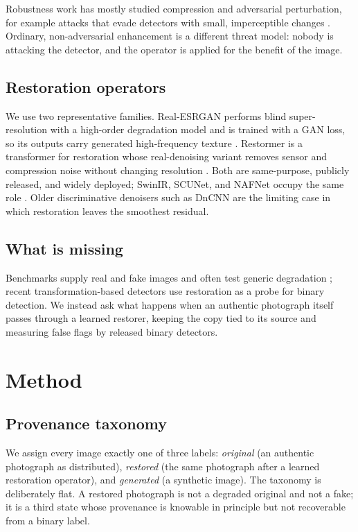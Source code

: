\documentclass[runningheads]{llncs}
\begin{document}
Robustness work has mostly studied compression and adversarial perturbation, for
example attacks that evade detectors with small, imperceptible changes
\cite{carlini2020evading}. Ordinary, non-adversarial enhancement is a different
threat model: nobody is attacking the detector, and the operator is applied for the
benefit of the image.

\subsection{Restoration operators}

We use two representative families. Real-ESRGAN performs blind super-resolution
with a high-order degradation model and is trained with a GAN loss, so its outputs
carry generated high-frequency texture \cite{wang2021realesrgan}. Restormer is a
transformer for restoration whose real-denoising variant removes sensor and
compression noise without changing resolution \cite{zamir2022restormer}. Both are
same-purpose, publicly released, and widely deployed; SwinIR, SCUNet, and NAFNet
occupy the same role \cite{liang2021swinir,zhang2023scunet,chen2022nafnet}. Older
discriminative denoisers such as DnCNN \cite{zhang2017dncnn} are the limiting case
in which restoration leaves the smoothest residual.

\subsection{What is missing}

Benchmarks supply real and fake images and often test generic degradation
\cite{zhu2023genimage}; recent transformation-based detectors use restoration
as a probe for binary detection. We instead ask what happens when an authentic
photograph itself passes through a learned restorer, keeping the copy tied to
its source and measuring false flags by released binary detectors.

\section{Method}

\subsection{Provenance taxonomy}

We assign every image exactly one of three labels:
\emph{original} (an authentic photograph as distributed),
\emph{restored} (the same photograph after a learned restoration operator),
and \emph{generated} (a synthetic image). The taxonomy is deliberately flat. A
restored photograph is not a degraded original and not a fake; it is a third state
whose provenance is knowable in principle but not recoverable from a binary label.
\end{document}
